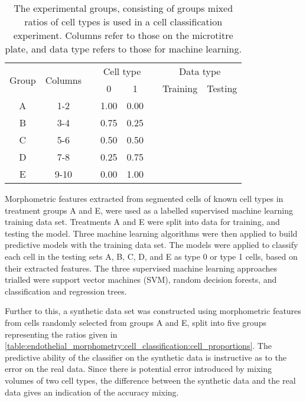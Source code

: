\begin{table}[htbp!]
\centering
\caption[Cell classification mixed ratio groups]{The experimental groups, consisting of groups mixed ratios of cell types is used in a cell classification experiment. Columns refer to those on the microtitre plate, and data type refers to those for machine learning.}
\label{table:endothelial_morphometry:cell_classification:cell_proportions}
\begin{tabular}{c c c c c c c c}
\toprule
\multirow{2}{*}{Group} & \multirow{2}{*}{Columns} & & \multicolumn{2}{c}{Cell type} & & \multicolumn{2}{c}{Data type} \\
\cmidrule{4-5}
\cmidrule{7-8}
	& & & 0 & 1 & & Training & Testing \\
\midrule
	A & 1-2  & & 1.00 & 0.00 & & \cmark & \cmark \\
	B & 3-4  & & 0.75 & 0.25 & & \xmark & \cmark \\
	C & 5-6  & & 0.50 & 0.50 & & \xmark & \cmark \\
	D & 7-8  & & 0.25 & 0.75 & & \xmark & \cmark \\
	E & 9-10 & & 0.00 & 1.00 & & \cmark & \cmark \\
\bottomrule
\end{tabular}
\end{table}

Morphometric features extracted from segmented cells of known cell types in treatment groups A and E, were used as a labelled supervised machine learning training data set. Treatments A and E were split into data for training, and testing the model. Three machine learning algorithms were then applied to build predictive models with the training data set. The models were applied to classify each cell in the testing sets A, B, C, D, and E as type 0 or type 1 cells, based on their extracted features. The three supervised machine learning approaches trialled were support vector machines (SVM), random decision forests, and classification and regression trees.

Further to this, a synthetic data set was constructed using morphometric features from cells randomly selected from groups A and E, split into five groups representing the ratios given in \autoref{table:endothelial_morphometry:cell_classification:cell_proportions}. The predictive ability of the classifier on the synthetic data is instructive as to the error on the real data. Since there is potential error introduced by mixing volumes of two cell types, the difference between the synthetic data and the real data gives an indication of the accuracy mixing.

